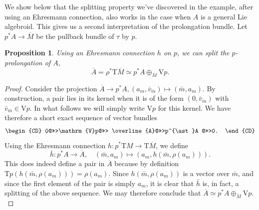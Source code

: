 \documentclass[11pt]{article}
\theoremstyle{plain}
\newtheorem{proposition}{Proposition}
\theoremstyle{definition}
\begin{document}
We show below that the splitting property we've discovered in the example, after using an Ehresmann connection, also works in the case when $A$ is a general Lie algebroid. This gives us a second interpretation of the prolongation bundle. Let $p^{\ast} A\to \overline{M}$ be the pullback bundle of $\tau$ by $p$.

\begin{proposition} \label{newprop1} Using an Ehresmann connection $h$ on $p$, we can split the $p$-prolongation of $A$,
\begin{equation*}
    \overline A  =\rho^*\mathrm{T}\overline M \simeq   p^{\ast}A\oplus_{\overline{M}} \mathrm{V}p.
\end{equation*}
\end{proposition}



\begin{proof}
Consider the projection $\overline A \to p^* A, (a_m,{\bar v}_{\bar m})\mapsto (\bar m, a_m)$. By construction, a pair   lies in its kernel when it is of the form $(0,{\bar v}_{\bar m})$ with ${\bar v}_{\bar m}\in \mathrm{V}p$. In what follows we will simply write $\mathrm{V}p$ for this kernel.
We have therefore a short exact sequence of vector bundles
\begin{equation*}
    \begin{CD}
    0@>>>\mathrm{V}p@>>> \overline{A}@>>>p^{\ast}A @>>>0.
    \end{CD}
\end{equation*}
Using the Ehresmann connection $h\colon p^*\mathrm{T}M \to \mathrm{T}\overline M$, we define
\begin{equation*}
    \bar h\colon p^*A \longrightarrow \overline A,\quad (\bar m,a_m) \longmapsto (a_m, h(\bar m, \rho(a_m))).
\end{equation*}
This does indeed define a pair  in $\overline A$  because by definition $\mathrm{T}p( h(\bar m, \rho(a_m)))=\rho(a_m)$. Since $ h(\bar m, \rho(a_m))$ is a vector over $\bar m$, and since the first element of the pair is simply $a_m$, it is clear that $\bar h$ is, in fact, a splitting of the above sequence. We may therefore conclude that $\overline A \simeq  p^{\ast}A\oplus_{\overline{M}} \mathrm{V}p.$ \end{proof}
\end{document}
